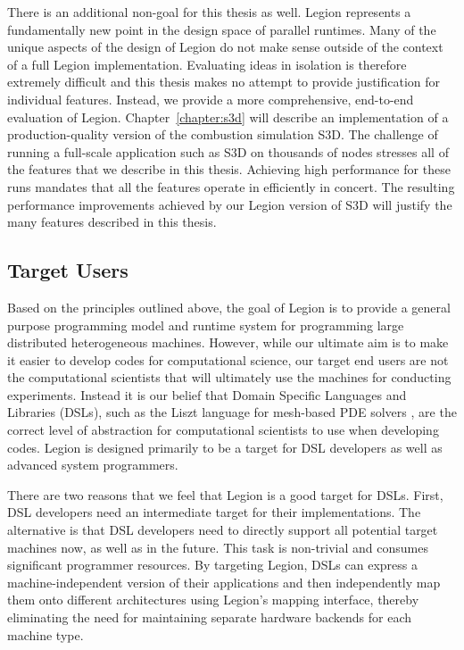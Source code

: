 There is an additional non-goal for this thesis as
well. Legion represents a fundamentally new point 
in the design space of parallel runtimes. Many of
the unique aspects of the design of Legion do not
make sense outside of the context of a full Legion
implementation. Evaluating ideas in isolation is 
therefore extremely difficult and this thesis 
makes no attempt to provide justification for 
individual features. Instead, we provide a more
comprehensive, end-to-end evaluation of Legion.
Chapter~\ref{chapter:s3d} will describe an 
implementation of a production-quality version 
of the combustion simulation S3D. The challenge 
of running a full-scale application such as 
S3D on thousands of nodes stresses all of the
features that we describe in this thesis.
Achieving high performance for these runs
mandates that all the features operate in 
efficiently in concert. The resulting performance
improvements achieved by our Legion version of S3D
will justify the many features described 
in this thesis.

\subsection{Target Users}
\label{subsec:users}
Based on the principles outlined above, the goal of Legion 
is to provide a general purpose programming model and
runtime system for programming large distributed 
heterogeneous machines.  However, while our 
ultimate aim is to make it easier to develop codes 
for computational science, our target end users are 
not the computational scientists that will ultimately use 
the machines for conducting experiments.  Instead it 
is our belief that Domain Specific Languages and 
Libraries (DSLs), such as the Liszt language for 
mesh-based PDE solvers \cite{Liszt11}, are the correct 
level of abstraction for computational scientists to 
use when developing codes. Legion is designed 
primarily to be a target for DSL developers as well as 
advanced system programmers.

There are two reasons that we feel that Legion is
a good target for DSLs. First, DSL developers
need an intermediate target for their implementations.
The alternative is that DSL developers need to directly
support all potential target machines now, as well as
in the future. This task is non-trivial and consumes
significant programmer resources. By targeting Legion,
DSLs can express a machine-independent version of their
applications and then independently map them onto 
different architectures using Legion's mapping interface,
thereby eliminating the need for maintaining separate
hardware backends for each machine type.

